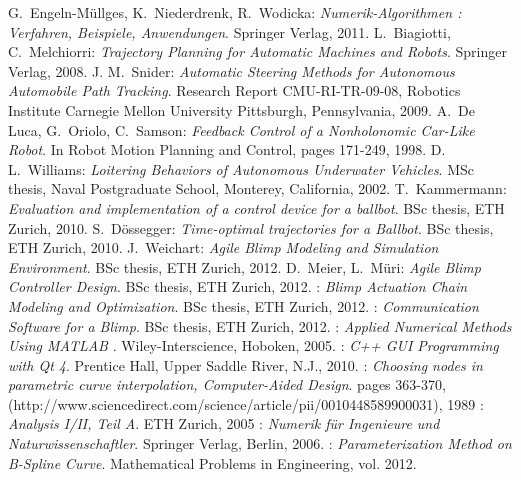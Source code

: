 \begin{thebibliography}{99}



 {\sc G.~Engeln-M{\"u}llges, K.~Niederdrenk, R.~Wodicka}:
{\it Numerik-Algorithmen : Verfahren, Beispiele, Anwendungen}. Springer Verlag, 2011.
 {\sc L.~Biagiotti, C.~Melchiorri}:
{\it Trajectory Planning for Automatic Machines and Robots}. Springer Verlag, 2008.
 {\sc J. M.~Snider}:
{\it Automatic Steering Methods for Autonomous Automobile Path Tracking}. Research Report CMU-RI-TR-09-08, Robotics Institute Carnegie Mellon University Pittsburgh, Pennsylvania, 2009.
 {\sc A.~De Luca, G.~Oriolo, C.~Samson}:
{\it Feedback Control of a Nonholonomic Car-Like Robot}. In Robot Motion Planning and Control, pages 171-249, 1998.
 {\sc D. L.~Williams}:
{\it Loitering Behaviors of Autonomous Underwater Vehicles}. MSc thesis, Naval Postgraduate School, Monterey, California, 2002.
 {\sc T.~Kammermann}:
{\it Evaluation and implementation of a control device for a ballbot}. BSc thesis, ETH Zurich, 2010.
 {\sc S.~D{\"o}ssegger}:
{\it Time-optimal trajectories for a Ballbot}. BSc thesis, ETH Zurich, 2010.
 {\sc J.~Weichart}:
{\it Agile Blimp Modeling and Simulation Environment}. BSc thesis, ETH Zurich, 2012.
 {\sc D.~Meier, L.~M{\"u}ri}:
{\it Agile Blimp Controller Design}. BSc thesis, ETH Zurich, 2012.
:
{\it Blimp Actuation Chain Modeling and Optimization}. BSc thesis, ETH Zurich, 2012.
:
{\it Communication Software for a Blimp}. BSc thesis, ETH Zurich, 2012.
:
{\it Applied Numerical Methods Using MATLAB} . Wiley-Interscience, Hoboken, 2005.
:
{\it C++ GUI Programming with Qt 4}. Prentice Hall, Upper Saddle River, N.J., 2010.
:
{\it Choosing nodes in parametric curve interpolation, Computer-Aided Design}. pages 363-370, (http://www.sciencedirect.com/science/article\-/pii/0010448589900031), 1989
:
{\it Analysis I/II, Teil A}. ETH Zurich, 2005
:
{\it Numerik f{\"u}r Ingenieure und Naturwissenschaftler}. Springer Verlag, Berlin, 2006.
:
{\it Parameterization Method on B-Spline Curve}. Mathematical Problems in Engineering, vol. 2012.

\end{thebibliography}
